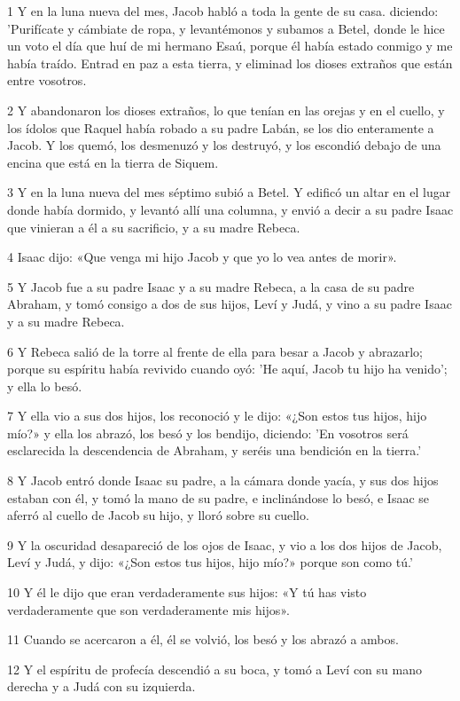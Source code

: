 \par 1 Y en la luna nueva del mes, Jacob habló a toda la gente de su casa. diciendo: 'Purifícate y cámbiate de ropa, y levantémonos y subamos a Betel, donde le hice un voto el día que huí de mi hermano Esaú, porque él había estado conmigo y me había traído. Entrad en paz a esta tierra, y eliminad los dioses extraños que están entre vosotros.
\par 2 Y abandonaron los dioses extraños, lo que tenían en las orejas y en el cuello, y los ídolos que Raquel había robado a su padre Labán, se los dio enteramente a Jacob. Y los quemó, los desmenuzó y los destruyó, y los escondió debajo de una encina que está en la tierra de Siquem.
\par 3 Y en la luna nueva del mes séptimo subió a Betel. Y edificó un altar en el lugar donde había dormido, y levantó allí una columna, y envió a decir a su padre Isaac que vinieran a él a su sacrificio, y a su madre Rebeca.
\par 4 Isaac dijo: «Que venga mi hijo Jacob y que yo lo vea antes de morir».
\par 5 Y Jacob fue a su padre Isaac y a su madre Rebeca, a la casa de su padre Abraham, y tomó consigo a dos de sus hijos, Leví y Judá, y vino a su padre Isaac y a su madre Rebeca.
\par 6 Y Rebeca salió de la torre al frente de ella para besar a Jacob y abrazarlo; porque su espíritu había revivido cuando oyó: 'He aquí, Jacob tu hijo ha venido'; y ella lo besó.
\par 7 Y ella vio a sus dos hijos, los reconoció y le dijo: «¿Son estos tus hijos, hijo mío?» y ella los abrazó, los besó y los bendijo, diciendo: 'En vosotros será esclarecida la descendencia de Abraham, y seréis una bendición en la tierra.'
\par 8 Y Jacob entró donde Isaac su padre, a la cámara donde yacía, y sus dos hijos estaban con él, y tomó la mano de su padre, e inclinándose lo besó, e Isaac se aferró al cuello de Jacob su hijo, y lloró sobre su cuello.
\par 9 Y la oscuridad desapareció de los ojos de Isaac, y vio a los dos hijos de Jacob, Leví y Judá, y dijo: «¿Son estos tus hijos, hijo mío?» porque son como tú.'
\par 10 Y él le dijo que eran verdaderamente sus hijos: «Y tú has visto verdaderamente que son verdaderamente mis hijos».
\par 11 Cuando se acercaron a él, él se volvió, los besó y los abrazó a ambos.
\par 12 Y el espíritu de profecía descendió a su boca, y tomó a Leví con su mano derecha y a Judá con su izquierda.

